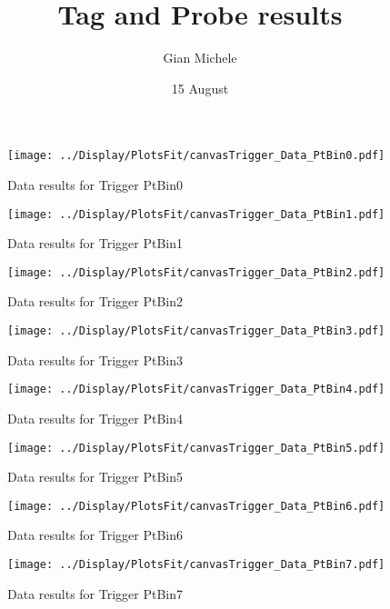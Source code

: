 \documentclass{article}
\begin{document}
\title{Tag and Probe results }
\author{Gian Michele}
\date{15 August}


\maketitle



\begin{figure}
    \texttt{[image: ../Display/PlotsFit/canvasTrigger\_Data\_PtBin0.pdf]}
    \caption{Data results for Trigger PtBin0 }
\end{figure}

\begin{figure}
    \texttt{[image: ../Display/PlotsFit/canvasTrigger\_Data\_PtBin1.pdf]}
    \caption{Data results for Trigger PtBin1 }
\end{figure}

\begin{figure}
    \texttt{[image: ../Display/PlotsFit/canvasTrigger\_Data\_PtBin2.pdf]}
    \caption{Data results for Trigger PtBin2 }
\end{figure}

\begin{figure}
    \texttt{[image: ../Display/PlotsFit/canvasTrigger\_Data\_PtBin3.pdf]}
    \caption{Data results for Trigger PtBin3 }
\end{figure}

\begin{figure}
    \texttt{[image: ../Display/PlotsFit/canvasTrigger\_Data\_PtBin4.pdf]}
    \caption{Data results for Trigger PtBin4 }
\end{figure}

\begin{figure}
    \texttt{[image: ../Display/PlotsFit/canvasTrigger\_Data\_PtBin5.pdf]}
    \caption{Data results for Trigger PtBin5 }
\end{figure}

\begin{figure}
    \texttt{[image: ../Display/PlotsFit/canvasTrigger\_Data\_PtBin6.pdf]}
    \caption{Data results for Trigger PtBin6 }
\end{figure}

\begin{figure}
    \texttt{[image: ../Display/PlotsFit/canvasTrigger\_Data\_PtBin7.pdf]}
    \caption{Data results for Trigger PtBin7 }
\end{figure}
\end{document}
